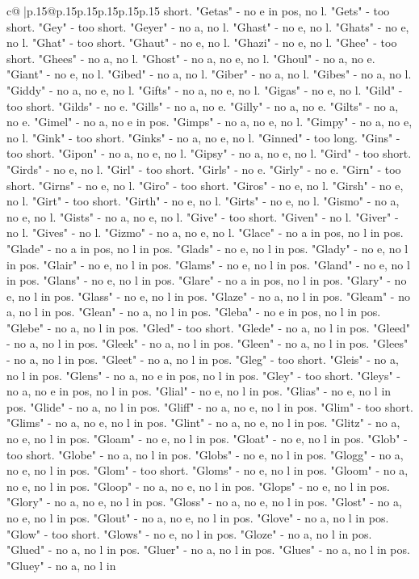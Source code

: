 \documentclass{article}
\begin{document}
{\begin{supertabular}{c@{$\;$}|p{.15\linewidth}@{}p{.15\linewidth}p{.15\linewidth}p{.15\linewidth}p{.15\linewidth}p{.15\linewidth}}
{{{short. "Getas" {-} no e in pos, no l. "Gets" {-} too short. "Gey" {-} too short. "Geyer" {-} no a, no l. "Ghast" {-} no e, no l. "Ghats" {-} no e, no l. "Ghat" {-} too short. "Ghaut" {-} no e, no l. "Ghazi" {-} no e, no l. "Ghee" {-} too short. "Ghees" {-} no a, no l. "Ghost" {-} no a, no e, no l. "Ghoul" {-} no a, no e. "Giant" {-} no e, no l. "Gibed" {-} no a, no l. "Giber" {-} no a, no l. "Gibes" {-} no a, no l. "Giddy" {-} no a, no e, no l. "Gifts" {-} no a, no e, no l. "Gigas" {-} no e, no l. "Gild" {-} too short. "Gilds" {-} no e. "Gills" {-} no a, no e. "Gilly" {-} no a, no e. "Gilts" {-} no a, no e. "Gimel" {-} no a, no e in pos. "Gimps" {-} no a, no e, no l. "Gimpy" {-} no a, no e, no l. "Gink" {-} too short. "Ginks" {-} no a, no e, no l. "Ginned" {-} too long. "Gins" {-} too short. "Gipon" {-} no a, no e, no l. "Gipsy" {-} no a, no e, no l. "Gird" {-} too short. "Girds" {-} no e, no l. "Girl" {-} too short. "Girls" {-} no e. "Girly" {-} no e. "Girn" {-} too short. "Girns" {-} no e, no l. "Giro" {-} too short. "Giros" {-} no e, no l. "Girsh" {-} no e, no l. "Girt" {-} too short. "Girth" {-} no e, no l. "Girts" {-} no e, no l. "Gismo" {-} no a, no e, no l. "Gists" {-} no a, no e, no l. "Give" {-} too short. "Given" {-} no l. "Giver" {-} no l. "Gives" {-} no l. "Gizmo" {-} no a, no e, no l. "Glace" {-} no a in pos, no l in pos. "Glade" {-} no a in pos, no l in pos. "Glads" {-} no e, no l in pos. "Glady" {-} no e, no l in pos. "Glair" {-} no e, no l in pos. "Glams" {-} no e, no l in pos. "Gland" {-} no e, no l in pos. "Glans" {-} no e, no l in pos. "Glare" {-} no a in pos, no l in pos. "Glary" {-} no e, no l in pos. "Glass" {-} no e, no l in pos. "Glaze" {-} no a, no l in pos. "Gleam" {-} no a, no l in pos. "Glean" {-} no a, no l in pos. "Gleba" {-} no e in pos, no l in pos. "Glebe" {-} no a, no l in pos. "Gled" {-} too short. "Glede" {-} no a, no l in pos. "Gleed" {-} no a, no l in pos. "Gleek" {-} no a, no l in pos. "Gleen" {-} no a, no l in pos. "Glees" {-} no a, no l in pos. "Gleet" {-} no a, no l in pos. "Gleg" {-} too short. "Gleis" {-} no a, no l in pos. "Glens" {-} no a, no e in pos, no l in pos. "Gley" {-} too short. "Gleys" {-} no a, no e in pos, no l in pos. "Glial" {-} no e, no l in pos. "Glias" {-} no e, no l in pos. "Glide" {-} no a, no l in pos. "Gliff" {-} no a, no e, no l in pos. "Glim" {-} too short. "Glims" {-} no a, no e, no l in pos. "Glint" {-} no a, no e, no l in pos. "Glitz" {-} no a, no e, no l in pos. "Gloam" {-} no e, no l in pos. "Gloat" {-} no e, no l in pos. "Glob" {-} too short. "Globe" {-} no a, no l in pos. "Globs" {-} no e, no l in pos. "Glogg" {-} no a, no e, no l in pos. "Glom" {-} too short. "Gloms" {-} no e, no l in pos. "Gloom" {-} no a, no e, no l in pos. "Gloop" {-} no a, no e, no l in pos. "Glops" {-} no e, no l in pos. "Glory" {-} no a, no e, no l in pos. "Gloss" {-} no a, no e, no l in pos. "Glost" {-} no a, no e, no l in pos. "Glout" {-} no a, no e, no l in pos. "Glove" {-} no a, no l in pos. "Glow" {-} too short. "Glows" {-} no e, no l in pos. "Gloze" {-} no a, no l in pos. "Glued" {-} no a, no l in pos. "Gluer" {-} no a, no l in pos. "Glues" {-} no a, no l in pos. "Gluey" {-} no a, no l in }}}
\end{supertabular}}
\end{document}

